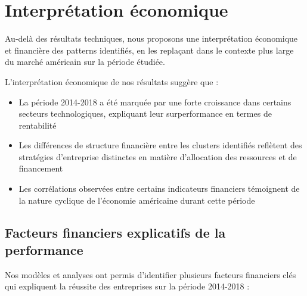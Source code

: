 \documentclass[11pt]{report}
\begin{document}
\section{Interprétation économique}
Au-delà des résultats techniques, nous proposons une interprétation économique et financière des patterns identifiés, en les replaçant dans le contexte plus large du marché américain sur la période étudiée.


L'interprétation économique de nos résultats suggère que :
\begin{itemize}
    \item La période 2014-2018 a été marquée par une forte croissance dans certains secteurs technologiques, expliquant leur surperformance en termes de rentabilité
    \item Les différences de structure financière entre les clusters identifiés reflètent des stratégies d'entreprise distinctes en matière d'allocation des ressources et de financement
    \item Les corrélations observées entre certains indicateurs financiers témoignent de la nature cyclique de l'économie américaine durant cette période
\end{itemize}

\subsection{Facteurs financiers explicatifs de la performance}
Nos modèles et analyses ont permis d'identifier plusieurs facteurs financiers clés qui expliquent la réussite des entreprises sur la période 2014-2018 :
\end{document}
